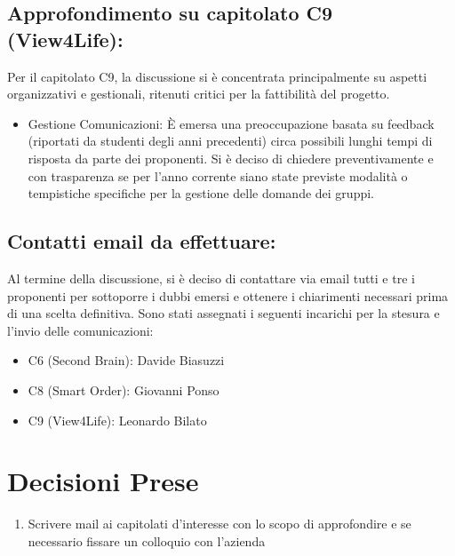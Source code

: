 \documentclass[a4paper, 11pt, oneside]{scrartcl} %
\begin{document}
\subsection{Approfondimento su capitolato C9 (View4Life):}
Per il capitolato C9, la discussione si è concentrata principalmente su aspetti organizzativi e gestionali, ritenuti critici per la fattibilità del progetto.
\begin{itemize}
    \item Gestione Comunicazioni: È emersa una preoccupazione basata su feedback (riportati da studenti degli anni precedenti) circa possibili lunghi tempi di risposta da parte dei proponenti. Si è deciso di chiedere preventivamente e con trasparenza se per l'anno corrente siano state previste modalità o tempistiche specifiche per la gestione delle domande dei gruppi.
\end{itemize}
\subsection{Contatti email da effettuare:}
Al termine della discussione, si è deciso di contattare via email tutti e tre i proponenti per sottoporre i dubbi emersi e ottenere i chiarimenti necessari prima di una scelta definitiva.
Sono stati assegnati i seguenti incarichi per la stesura e l'invio delle comunicazioni:

\begin{itemize}
    \item C6 (Second Brain): Davide Biasuzzi
    \item C8 (Smart Order): Giovanni Ponso
    \item C9 (View4Life): Leonardo Bilato
\end{itemize}
\newpage
\section{Decisioni Prese}

\begin{enumerate}
    \item Scrivere mail ai capitolati d'interesse con lo scopo di approfondire e se necessario fissare un colloquio con l'azienda
\end{enumerate}

\newpage
\end{document}
